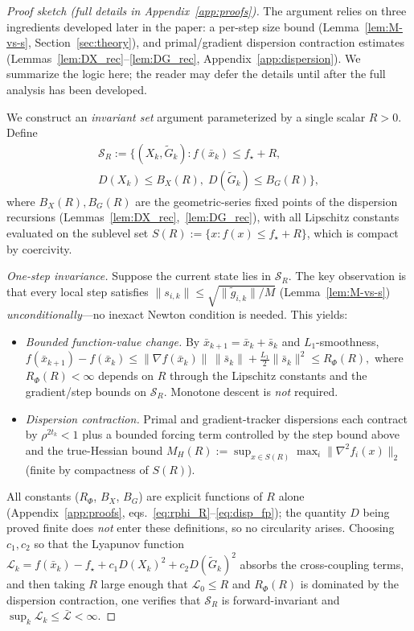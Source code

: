 \documentclass[10pt,twocolumn,letterpaper]{article}
\theoremstyle{compact}
\theoremstyle{compactremark}
\begin{document}
	\begin{proof}[Proof sketch (full details in Appendix~\ref{app:proofs})]
	The argument relies on three ingredients developed later in the
	paper: a per-step size bound
	(Lemma~\ref{lem:M-vs-s}, Section~\ref{sec:theory}),
	and primal/gradient dispersion contraction estimates
	(Lemmas~\ref{lem:DX_rec}--\ref{lem:DG_rec},
	Appendix~\ref{app:dispersion}).
	We summarize the logic here; the reader may defer the details
	until after the full analysis has been developed.

	We construct an \emph{invariant set} argument parameterized by
	a single scalar $R>0$.
	Define
	\begin{multline*}
	  \mathcal S_R := \bigl\{(X_k,\tilde G_k) :
	  f(\bar x_k)\le f_\star+R,\\
	  D(X_k)\le B_X(R),\;
	  D(\tilde G_k)\le B_G(R)\bigr\},
	\end{multline*}
	where $B_X(R),B_G(R)$ are the geometric-series fixed points of the
	dispersion recursions (Lemmas~\ref{lem:DX_rec},~\ref{lem:DG_rec}),
	with all Lipschitz constants evaluated on the sublevel set
	$S(R):=\{x:f(x)\le f_\star+R\}$, which is compact by coercivity.

	\emph{One-step invariance.}
	Suppose the current state lies in $\mathcal S_R$.
	The key observation is that every local step satisfies
	$\|s_{i,k}\|\le\sqrt{\|\tilde g_{i,k}\|/M}$
	(Lemma~\ref{lem:M-vs-s})
	\emph{unconditionally}---no inexact Newton condition is needed.
	This yields:
	\begin{itemize}[leftmargin=1.2em,itemsep=1pt]
	  \item \emph{Bounded function-value change.}
	        By $\bar x_{k+1}=\bar x_k+\bar s_k$ and $L_1$-smoothness,
	        \(
	        f(\bar x_{k+1})-f(\bar x_k)
	        \le \|\nabla f(\bar x_k)\|\,\|\bar s_k\|
	            +\tfrac{L_1}{2}\|\bar s_k\|^2
	        \le R_\Phi(R),
	        \)
	        where $R_\Phi(R)<\infty$ depends on $R$ through the Lipschitz
	        constants and the gradient/step bounds on $\mathcal S_R$.
	        Monotone descent is \emph{not} required.
	  \item \emph{Dispersion contraction.}
	        Primal and gradient-tracker dispersions each contract by
	        $\rho^{2t_k}<1$ plus a bounded forcing term controlled by
	        the step bound above and the true-Hessian bound
	        $M_H(R):=\sup_{x\in S(R)}\max_i\|\nabla^2 f_i(x)\|_2$
	        (finite by compactness of $S(R)$).
	\end{itemize}
	All constants ($R_\Phi$, $B_X$, $B_G$) are explicit functions of
	$R$ alone (Appendix~\ref{app:proofs},
	eqs.~\eqref{eq:rphi_R}--\eqref{eq:disp_fp});
	the quantity $D$ being proved finite does \emph{not} enter these
	definitions, so no circularity arises.
	Choosing $c_1,c_2$ so that the Lyapunov function
	$\mathcal L_k=f(\bar x_k)-f_\star+c_1D(X_k)^2+c_2D(\tilde G_k)^2$
	absorbs the cross-coupling terms, and then taking $R$ large enough
	that $\mathcal L_0\le R$ and $R_\Phi(R)$ is dominated by the
	dispersion contraction, one verifies that $\mathcal S_R$ is
	forward-invariant and
	$\sup_{k}\mathcal L_k\le\bar{\mathcal L}<\infty$.


\end{proof}
\end{document}
